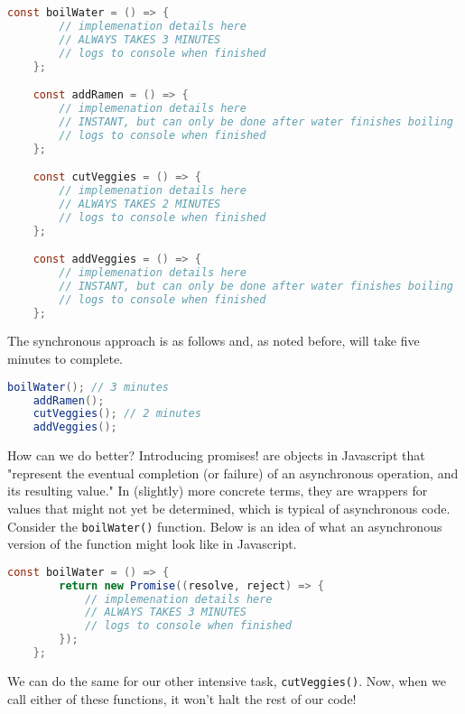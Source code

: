 \begin{lstlisting}[language=Java]
    const boilWater = () => {
        // implemenation details here
        // ALWAYS TAKES 3 MINUTES
        // logs to console when finished
    };

    const addRamen = () => {
        // implemenation details here
        // INSTANT, but can only be done after water finishes boiling
        // logs to console when finished
    };

    const cutVeggies = () => {
        // implemenation details here
        // ALWAYS TAKES 2 MINUTES
        // logs to console when finished
    };

    const addVeggies = () => {
        // implemenation details here
        // INSTANT, but can only be done after water finishes boiling
        // logs to console when finished
    };
\end{lstlisting}

The synchronous approach is as follows and, as noted before, will take five minutes to complete.

\begin{lstlisting}[language=Java] 
    boilWater(); // 3 minutes
    addRamen();
    cutVeggies(); // 2 minutes
    addVeggies();
\end{lstlisting}

How can we do better? Introducing promises!  are objects in Javascript that "represent the eventual completion (or failure) of an asynchronous operation, and its resulting value." In (slightly) more concrete terms, they are wrappers for values that might not yet be determined, which is typical of asynchronous code. Consider the \texttt{boilWater()} function. Below is an idea of what an asynchronous version of the function might look like in Javascript. 

\begin{lstlisting}[language=Java] 
    const boilWater = () => {
        return new Promise((resolve, reject) => {
            // implemenation details here
            // ALWAYS TAKES 3 MINUTES
            // logs to console when finished
        });        
    };
\end{lstlisting}

We can do the same for our other intensive task, \texttt{cutVeggies()}. Now, when we call either of these functions, it won't halt the rest of our code!

